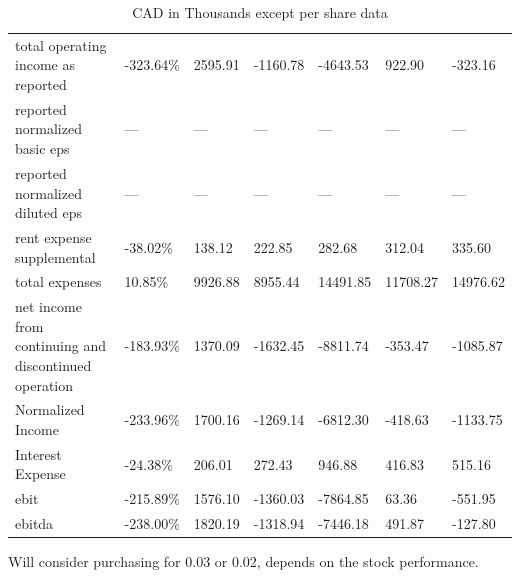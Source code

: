\begin{table}[]
{\begin{tabular}{@{}lllllll@{}}
total operating income as reported                            & -323.64\%  & 2595.91   & -1160.78  & -4643.53 & 922.90   & -323.16  \\
reported normalized basic eps                                 & —          & —         & —         & —        & —        & —        \\
reported normalized diluted eps                               & —          & —         & —         & —        & —        & —        \\
rent expense supplemental                                     & -38.02\%   & 138.12    & 222.85    & 282.68   & 312.04   & 335.60   \\
total expenses                                                & 10.85\%    & 9926.88   & 8955.44   & 14491.85 & 11708.27 & 14976.62 \\
net income from continuing and discontinued operation         & -183.93\%  & 1370.09   & -1632.45  & -8811.74 & -353.47  & -1085.87 \\
Normalized Income                                             & -233.96\%  & 1700.16   & -1269.14  & -6812.30 & -418.63  & -1133.75 \\
Interest Expense                                              & -24.38\%   & 206.01    & 272.43    & 946.88   & 416.83   & 515.16   \\
ebit                                                          & -215.89\%  & 1576.10   & -1360.03  & -7864.85 & 63.36    & -551.95  \\
ebitda                                                        & -238.00\%  & 1820.19   & -1318.94  & -7446.18 & 491.87   & -127.80  \\ \bottomrule
\end{tabular}%
}
\caption{CAD in Thousands except per share data}
\end{table}

Will consider purchasing for 0.03 or 0.02, depends on the stock performance.
